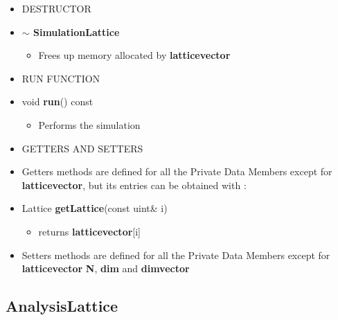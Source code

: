 \begin{itemize}
\begin{itemize}
		\item[] DESTRUCTOR \\
		
			\item[] \textbf{$\sim$ SimulationLattice}	 
			\begin{itemize}
				\item[] Frees up memory allocated by \textbf{lattice\textunderscore vector}  \\
			\end{itemize}
			
		\item[] RUN FUNCTION \\
			
			\item[] void \textbf{run}() const		 
			\begin{itemize}
				\item[] Performs the simulation \\  
			\end{itemize}
						
		
		\item[] GETTERS AND SETTERS \\
 			
 			\item[] Getters methods are defined for all the Private Data Members except for \textbf{lattice\textunderscore vector}, but its entries can be obtained with : 
 			  
 			\item[] Lattice \textbf{getLattice}(const uint\& i)		 
			\begin{itemize}
				\item[] returns \textbf{lattice\textunderscore vector}[i]  
			\end{itemize}
 					
 			\item[] Setters methods are defined for all the Private Data Members except for \textbf{lattice\textunderscore vector} \textbf{N}, \textbf{dim} and \textbf{dim\textunderscore vector}   
 			 		
	\end{itemize}

	
\end{itemize}

\newpage

\subsection*{AnalysisLattice}


